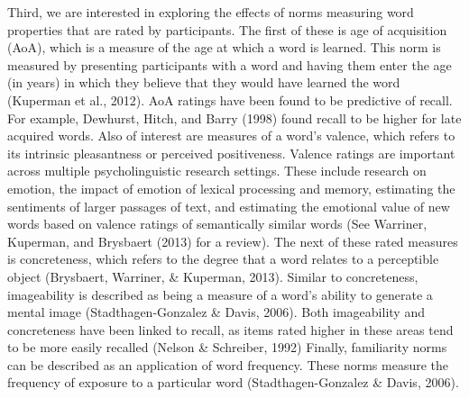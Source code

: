 \documentclass[english,man]{apa6}
\theoremstyle{definition}
\theoremstyle{definition}
\theoremstyle{definition}
\theoremstyle{remark}
\begin{document}
Third, we are interested in exploring the effects of norms measuring
word properties that are rated by participants. The first of these is
age of acquisition (AoA), which is a measure of the age at which a word
is learned. This norm is measured by presenting participants with a word
and having them enter the age (in years) in which they believe that they
would have learned the word (Kuperman et al., 2012). AoA ratings have
been found to be predictive of recall. For example, Dewhurst, Hitch, and
Barry (1998) found recall to be higher for late acquired words. Also of
interest are measures of a word's valence, which refers to its intrinsic
pleasantness or perceived positiveness. Valence ratings are important
across multiple psycholinguistic research settings. These include
research on emotion, the impact of emotion of lexical processing and
memory, estimating the sentiments of larger passages of text, and
estimating the emotional value of new words based on valence ratings of
semantically similar words (See Warriner, Kuperman, and Brysbaert (2013)
for a review). The next of these rated measures is concreteness, which
refers to the degree that a word relates to a perceptible object
(Brysbaert, Warriner, \& Kuperman, 2013). Similar to concreteness,
imageability is described as being a measure of a word's ability to
generate a mental image (Stadthagen-Gonzalez \& Davis, 2006). Both
imageability and concreteness have been linked to recall, as items rated
higher in these areas tend to be more easily recalled (Nelson \&
Schreiber, 1992) Finally, familiarity norms can be described as an
application of word frequency. These norms measure the frequency of
exposure to a particular word (Stadthagen-Gonzalez \& Davis, 2006).
\end{document}

